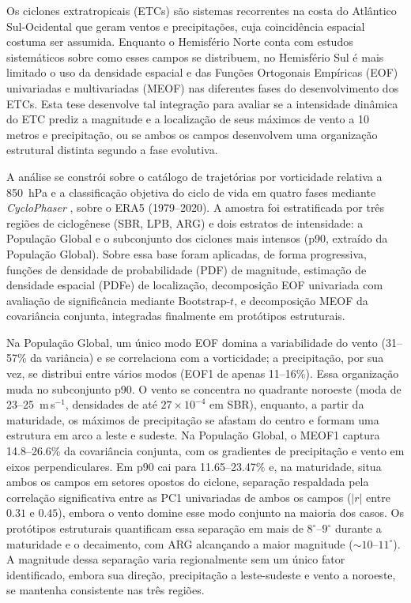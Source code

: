 Os ciclones extratropicais (ETCs) são sistemas recorrentes na costa do Atlântico Sul-Ocidental que geram ventos e precipitações, cuja coincidência espacial costuma ser assumida.
Enquanto o Hemisfério Norte conta com estudos sistemáticos sobre como esses campos se distribuem, no Hemisfério Sul é mais limitado o uso da densidade espacial e das Funções Ortogonais Empíricas (EOF) univariadas e multivariadas (MEOF) nas diferentes fases do desenvolvimento dos ETCs.
Esta tese desenvolve tal integração para avaliar se a intensidade dinâmica do ETC prediz a magnitude e a localização de seus máximos de vento a 10 metros e precipitação, ou se ambos os campos desenvolvem uma organização estrutural distinta segundo a fase evolutiva.

A análise se constrói sobre o catálogo de trajetórias por vorticidade relativa a 850~hPa \citep{gramcianinov2020analysis} e a classificação objetiva do ciclo de vida em quatro fases mediante \textit{CycloPhaser} \citep{coutodesouza2024new, deSouza2025CycloPhaser}, sobre o ERA5 (1979--2020).
A amostra foi estratificada por três regiões de ciclogênese (SBR, LPB, ARG) e dois estratos de intensidade: a População Global e o subconjunto dos ciclones mais intensos (p90, extraído da População Global).
Sobre essa base foram aplicadas, de forma progressiva, funções de densidade de probabilidade (PDF) de magnitude, estimação de densidade espacial (PDFe) de localização, decomposição EOF univariada com avaliação de significância mediante Bootstrap-$t$, e decomposição MEOF da covariância conjunta, integradas finalmente em protótipos estruturais.

Na População Global, um único modo EOF domina a variabilidade do vento (31--57\% da variância) e se correlaciona com a vorticidade; a precipitação, por sua vez, se distribui entre vários modos (EOF1 de apenas 11--16\%).
Essa organização muda no subconjunto p90. O vento se concentra no quadrante noroeste (moda de 23--25~m\,s$^{-1}$, densidades de até $27\times10^{-4}$ em SBR), enquanto, a partir da maturidade, os máximos de precipitação se afastam do centro e formam uma estrutura em arco a leste e sudeste.
Na População Global, o MEOF1 captura 14.8--26.6\% da covariância conjunta, com os gradientes de precipitação e vento em eixos perpendiculares. Em p90 cai para 11.65--23.47\% e, na maturidade, situa ambos os campos em setores opostos do ciclone, separação respaldada pela correlação significativa entre as PC1 univariadas de ambos os campos ($|r|$ entre $0.31$ e $0.45$), embora o vento domine esse modo conjunto na maioria dos casos.
Os protótipos estruturais quantificam essa separação em mais de $8^{\circ}$--$9^{\circ}$ durante a maturidade e o decaimento, com ARG alcançando a maior magnitude (${\sim}10$--$11^{\circ}$).
A magnitude dessa separação varia regionalmente sem um único fator identificado, embora sua direção, precipitação a leste-sudeste e vento a noroeste, se mantenha consistente nas três regiões.


